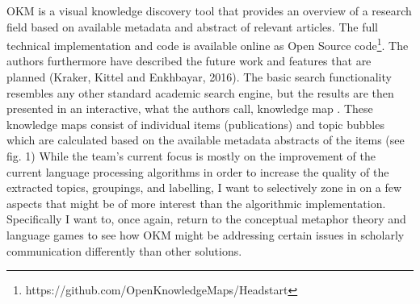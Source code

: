 OKM is a visual knowledge discovery tool that provides an overview of a
research field based on available metadata and abstract of relevant
articles. The full technical implementation and code is available online
as Open Source code\footnote{https://github.com/OpenKnowledgeMaps/Headstart}.
The authors furthermore have described the future work and features that
are planned (Kraker, Kittel and Enkhbayar, 2016). The basic search
functionality resembles any other standard academic search engine, but
the results are then presented in an interactive, what the authors call,
knowledge map . These knowledge maps consist of individual items
(publications) and topic bubbles which are calculated based on the
available metadata abstracts of the items (see fig. 1) While the team’s
current focus is mostly on the improvement of the current language
processing algorithms in order to increase the quality of the extracted
topics, groupings, and labelling, I want to selectively zone in on a few
aspects that might be of more interest than the algorithmic
implementation. Specifically I want to, once again, return to the
conceptual metaphor theory and language games to see how
OKM might be addressing certain issues in scholarly communication
differently than other solutions.
